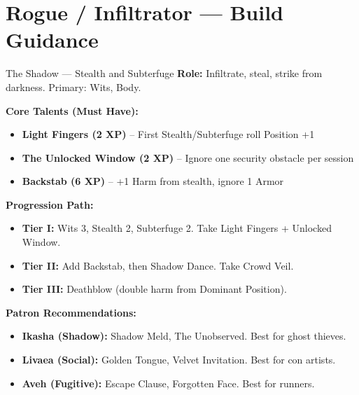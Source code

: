 \documentclass[10pt]{article}
\begin{document}
\newpage


\section*{Rogue / Infiltrator --- Build Guidance}

\begin{tipbox}{The Shadow --- Stealth and Subterfuge}
    \textbf{Role:} Infiltrate, steal, strike from darkness. Primary: Wits, Body.
    
    \textbf{Core Talents (Must Have):}
    \begin{itemize}
        \item \textbf{Light Fingers (2 XP)} -- First Stealth/Subterfuge roll Position +1
        \item \textbf{The Unlocked Window (2 XP)} -- Ignore one security obstacle per session
        \item \textbf{Backstab (6 XP)} -- +1 Harm from stealth, ignore 1 Armor
    \end{itemize}
    
    \textbf{Progression Path:}
    \begin{itemize}
        \item \textbf{Tier I:} Wits 3, Stealth 2, Subterfuge 2. Take Light Fingers + Unlocked Window.
        \item \textbf{Tier II:} Add Backstab, then Shadow Dance. Take Crowd Veil.
        \item \textbf{Tier III:} Deathblow (double harm from Dominant Position).
    \end{itemize}
    
    \textbf{Patron Recommendations:}
    \begin{itemize}
        \item \textbf{Ikasha (Shadow):} Shadow Meld, The Unobserved. Best for ghost thieves.
        \item \textbf{Livaea (Social):} Golden Tongue, Velvet Invitation. Best for con artists.
        \item \textbf{Aveh (Fugitive):} Escape Clause, Forgotten Face. Best for runners.
    \end{itemize}
\end{tipbox}
\end{document}
